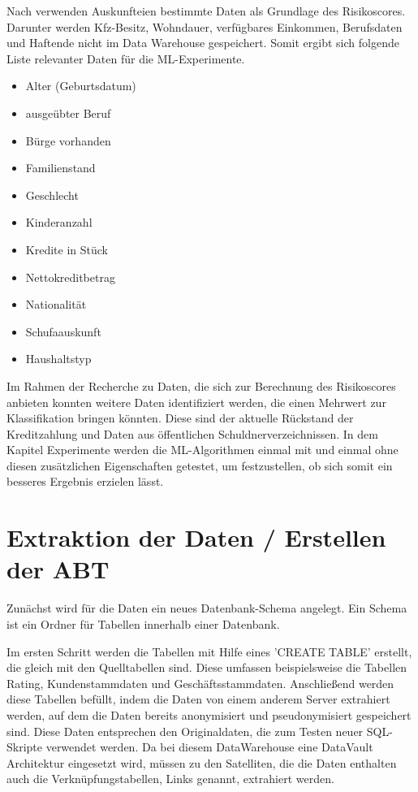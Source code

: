 
Nach \cite{sokol2005} verwenden Auskunfteien bestimmte Daten als Grundlage des Risikoscores. 
Darunter werden Kfz-Besitz, Wohndauer, verfügbares Einkommen, Berufsdaten und Haftende nicht im Data Warehouse gespeichert. 
Somit ergibt sich folgende Liste relevanter Daten für die ML-Experimente. 

\begin{itemize}
 \item Alter (Geburtsdatum)
 \item ausgeübter Beruf
 \item Bürge vorhanden
 \item Familienstand
 \item Geschlecht
 \item Kinderanzahl
 \item Kredite in Stück 
 \item Nettokreditbetrag 
 \item Nationalität
 \item Schufaauskunft
 \item Haushaltstyp
\end{itemize}


Im Rahmen der Recherche zu Daten, die sich zur Berechnung des Risikoscores anbieten konnten weitere Daten identifiziert werden, die einen Mehrwert zur Klassifikation bringen könnten. 
Diese sind der aktuelle Rückstand der Kreditzahlung und Daten aus öffentlichen Schuldnerverzeichnissen.
In dem Kapitel Experimente werden die ML-Algorithmen einmal mit und einmal ohne diesen zusätzlichen Eigenschaften getestet, um festzustellen, ob sich somit ein besseres Ergebnis erzielen lässt. 


\section{Extraktion der Daten / Erstellen der ABT}
Zunächst wird für die Daten ein neues Datenbank-Schema angelegt.
Ein Schema ist ein Ordner für Tabellen innerhalb einer Datenbank.

Im ersten Schritt werden die Tabellen mit Hilfe eines 'CREATE TABLE' erstellt, die gleich mit den Quelltabellen sind. 
Diese umfassen beispielsweise die Tabellen Rating, Kundenstammdaten und Geschäftsstammdaten. 
Anschließend werden diese Tabellen befüllt, indem die Daten von einem anderem Server extrahiert werden, auf dem die Daten bereits anonymisiert und pseudonymisiert gespeichert sind. 
Diese Daten entsprechen den Originaldaten, die zum Testen neuer SQL-Skripte verwendet werden. 
Da bei diesem DataWarehouse eine DataVault Architektur eingesetzt wird, müssen zu den Satelliten, die die Daten enthalten auch die Verknüpfungstabellen, Links genannt, extrahiert werden.  

